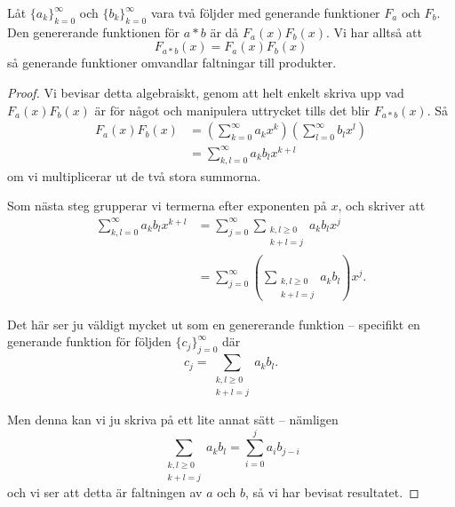 \documentclass[nobib]{tufte-handout}
\begin{document}
\begin{theorem}\label{convolution_is_product_of_gen_funcs}
    Låt $\{a_k\}_{k=0}^\infty$ och $\{b_k\}_{k=0}^\infty$ vara två följder med generande funktioner $F_a$ och $F_b$. Den genererande funktionen för $a*b$ är då $F_a(x)F_b(x)$. Vi har alltså att
    $$F_{a*b}(x) = F_a(x)F_b(x)$$
    så generande funktioner omvandlar faltningar till produkter.

    \begin{proof}
        Vi bevisar detta algebraiskt, genom att helt enkelt skriva upp vad $F_a(x)F_b(x)$ är för något och manipulera uttrycket tills det blir $F_{a*b}(x)$. Så
        \begin{align*}
            F_a(x)F_b(x) &= \left(\sum_{k=0}^{\infty} a_k x^k\right)\left(\sum_{l=0}^{\infty} b_l x^l\right)\\
            &= \sum_{k, l = 0}^{\infty} a_k b_l x^{k+l}
        \end{align*}
        om vi multiplicerar ut de två stora summorna.

        Som nästa steg grupperar vi termerna efter exponenten på $x$, och skriver att
        \begin{align*}
            \sum_{k, l = 0}^{\infty} a_k b_l x^{k+l} &= \sum_{j=0}^{\infty} \sum_{\substack{k, l \geq 0\\k + l = j}} a_k b_l x^j\\
            &= \sum_{j=0}^{\infty} \left(\sum_{\substack{k, l \geq 0\\k + l = j}} a_k b_l\right) x^j.
        \end{align*}

        Det här ser ju väldigt mycket ut som en genererande funktion -- specifikt en generande funktion för följden $\{c_j\}_{j=0}^\infty$ där
        $$c_j = \sum_{\substack{k, l \geq 0\\k + l = j}} a_k b_l.$$

        Men denna kan vi ju skriva på ett lite annat sätt -- nämligen
        $$\sum_{\substack{k, l \geq 0\\k + l = j}} a_k b_l = \sum_{i=0}^{j}a_{i} b_{j-i}$$
        och vi ser att detta är faltningen av $a$ och $b$, så vi har bevisat resultatet.
    \end{proof}
\end{theorem}
\end{document}
